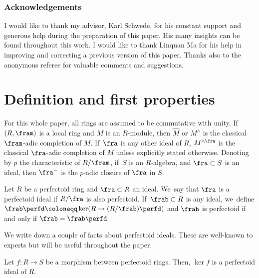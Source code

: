 \subsubsection*{Acknowledgements}
I would like to thank my advisor, Karl Schwede, for his constant support and generous help during the preparation of this paper. His many insights can be found throughout this work. I would like to thank Linquan Ma for his help in improving and correcting a previous version of this paper. Thanks also to the anonymous referee for valuable comments and suggestions.

\section{Definition and first properties}

\begin{notation}
For this whole paper, all rings are assumed to be commutative with unity. If~$(R,\fram)$ is a local ring and $M$ is an $R$\nobreakdash-module, then $\widehat{M}$ or $M^\wedge$ is the classical $\fram$-adic completion of $M$. If~$\fra$ is any other ideal of $R$, $M^{\wedge \fra}$ is the classical $\fra$-adic completion of $M$ unless explicitly stated otherwise. Denoting by $p$ the characteristic of $R/\fram$, if~$S$ is an $R$\nobreakdash-algebra, and $\fra\subset S$ is an ideal, then $\fra^-$ is the $p$-adic closure of $\fra$ in $S$.
\end{notation}


\begin{definition}\label{definition perfectoidization}
Let $R$ be a perfectoid ring and $\fra\subset R$ an ideal. We~say that $\fra$ is a perfectoid ideal if $R/\fra$ is also perfectoid. If~$\frab\subset R$ is any ideal, we~define $\frab\perfd\coloneqq \ker(R\to (R/\frab)\perfd)$ and $\frab$ is perfectoid if and only if $\frab=\frab\perfd$.
\end{definition}

We write down a couple of facts about perfectoid ideals. These are well-known to experts but will be useful throughout the paper.

\begin{proposition}\label{kernel of map of perfd rings}
Let $f\colon R\to S$ be a morphism between perfectoid rings. Then, $\ker f$ is a perfectoid ideal of $R$.
\end{proposition}

